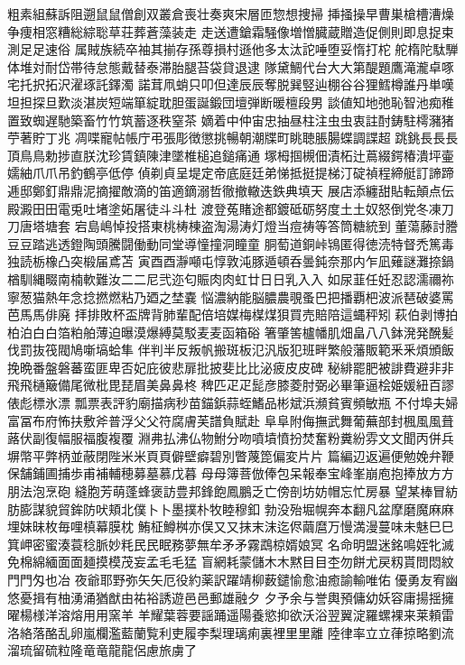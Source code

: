 粗素組蘇訴阻遡⿏鼠僧創双叢倉喪壮奏爽宋層匝惣想捜掃
挿掻操早曹巣槍槽漕燥争痩相窓糟総綜聡草荘葬蒼藻装⾛
走送遭鎗霜騒像増憎臓蔵贈造促側則即息捉束測⾜足速俗
属賊族続卒袖其揃存孫尊損村遜他多太汰詑唾堕妥惰打柁
舵楕陀駄騨体堆対耐岱帯待怠態戴替泰滞胎腿苔袋貸退逮
隊黛鯛代台⼤大第醍題鷹滝瀧卓啄宅托択拓沢濯琢託鐸濁
諾茸凧蛸只叩但達⾠辰奪脱巽竪辿棚⾕谷狸鱈樽誰丹単嘆
坦担探旦歎淡湛炭短端箪綻耽胆蛋誕鍛団壇弾断暖檀段男
談値知地弛恥智池痴稚置致蜘遅馳築畜⽵竹筑蓄逐秩窒茶
嫡着中仲宙忠抽昼柱注⾍虫衷註酎鋳駐樗瀦猪苧著貯丁兆
凋喋寵帖帳庁弔張彫徴懲挑暢朝潮牒町眺聴脹腸蝶調諜超
跳銚⻑⾧長頂⿃鳥勅捗直朕沈珍賃鎮陳津墜椎槌追鎚痛通
塚栂掴槻佃漬柘辻蔦綴鍔椿潰坪壷嬬紬⽖爪吊釣鶴亭低停
偵剃貞呈堤定帝底庭廷弟悌抵挺提梯汀碇禎程締艇訂諦蹄
逓邸鄭釘⿍鼎泥摘擢敵滴的笛適鏑溺哲徹撤轍迭鉄典填天
展店添纏甜貼転顛点伝殿澱⽥田電兎吐堵塗妬屠徒⽃斗杜
渡登菟賭途都鍍砥砺努度⼟土奴怒倒党冬凍⼑刀唐塔塘套
宕島嶋悼投搭東桃梼棟盗淘湯涛灯燈当痘祷等答筒糖統到
董蕩藤討謄⾖豆踏逃透鐙陶頭騰闘働動同堂導憧撞洞瞳童
胴萄道銅峠鴇匿得徳涜特督禿篤毒独読栃橡凸突椴届鳶苫
寅⾣酉瀞噸屯惇敦沌豚遁頓呑曇鈍奈那内乍凪薙謎灘捺鍋
楢馴縄畷南楠軟難汝⼆二尼弐迩匂賑⾁肉虹廿⽇日乳⼊入
如尿韮任妊忍認濡禰祢寧葱猫熱年念捻撚燃粘乃廼之埜嚢
悩濃納能脳膿農覗蚤巴把播覇杷波派琶破婆罵芭⾺馬俳廃
拝排敗杯盃牌背肺輩配倍培媒梅楳煤狽買売賠陪這蝿秤矧
萩伯剥博拍柏泊⽩白箔粕舶薄迫曝漠爆縛莫駁⻨麦函箱硲
箸肇筈櫨幡肌畑畠⼋八鉢溌発醗髪伐罰抜筏閥鳩噺塙蛤隼
伴判半反叛帆搬斑板氾汎版犯班畔繁般藩販範⾤釆煩頒飯
挽晩番盤磐蕃蛮匪卑否妃庇彼悲扉批披斐⽐比泌疲⽪皮碑
秘緋罷肥被誹費避⾮非⾶飛樋簸備尾微枇毘琵眉美⿐鼻柊
稗匹⽦疋髭彦膝菱肘弼必畢筆逼桧姫媛紐百謬俵彪標氷漂
瓢票表評豹廟描病秒苗錨鋲蒜蛭鰭品彬斌浜瀕貧賓頻敏瓶
不付埠夫婦富冨布府怖扶敷斧普浮⽗父符腐膚芙譜負賦赴
⾩阜附侮撫武舞葡蕪部封楓⾵風葺蕗伏副復幅服福腹複覆
淵弗払沸仏物鮒分吻噴墳憤扮焚奮粉糞紛雰⽂文聞丙併兵
塀幣平弊柄並蔽閉陛⽶米⾴頁僻壁癖碧別瞥蔑箆偏変⽚片
篇編辺返遍便勉娩弁鞭保舗鋪圃捕歩甫補輔穂募墓慕戊暮
⺟母簿菩倣俸包呆報奉宝峰峯崩庖抱捧放⽅方朋法泡烹砲
縫胞芳萌蓬蜂褒訪豊邦鋒飽鳳鵬乏亡傍剖坊妨帽忘忙房暴
望某棒冒紡肪膨謀貌貿鉾防吠頬北僕⼘卜墨撲朴牧睦穆釦
勃没殆堀幌奔本翻凡盆摩磨魔⿇麻埋妹昧枚毎哩槙幕膜枕
鮪柾鱒桝亦俣⼜又抹末沫迄侭繭麿万慢満漫蔓味未魅⺒巳
箕岬密蜜湊蓑稔脈妙粍⺠民眠務夢無牟⽭矛霧鵡椋婿娘冥
名命明盟迷銘鳴姪牝滅免棉綿緬⾯面麺摸模茂妄孟⽑毛猛
盲網耗蒙儲⽊木黙⽬目杢勿餅尤戻籾貰問悶紋⾨門匁也冶
夜爺耶野弥⽮矢厄役約薬訳躍靖柳薮鑓愉愈油癒諭輸唯佑
優勇友宥幽悠憂揖有柚湧涌猶猷由祐裕誘遊⾢邑郵雄融⼣
夕予余与誉輿預傭幼妖容庸揚揺擁曜楊様洋溶熔⽤用窯⽺
羊耀葉蓉要謡踊遥陽養慾抑欲沃浴翌翼淀羅螺裸来莱頼雷
洛絡落酪乱卵嵐欄濫藍蘭覧利吏履李梨理璃痢裏裡⾥里離
陸律率⽴立葎掠略劉流溜琉留硫粒隆⻯竜⿓龍侶慮旅虜了
